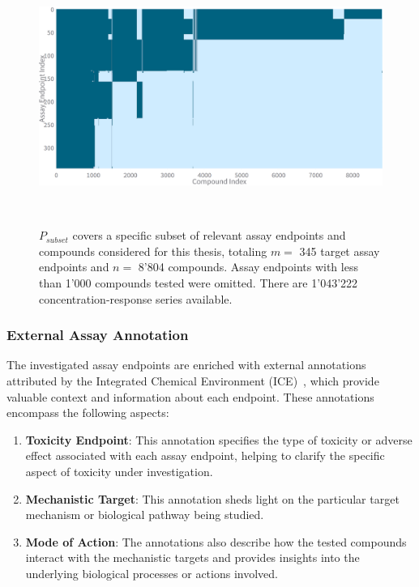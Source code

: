 \begin{figure}[h]
    \centering
    \includegraphics[width=1.0\textwidth]{figures/presence_matrix_subset.png}
    \caption{$P_{subset}$ covers a specific subset of relevant assay endpoints and compounds considered for this thesis, totaling $m =$ 345 target assay endpoints and $n =$ 8'804 compounds. Assay endpoints with less than 1'000 compounds tested were omitted. There are 1'043'222 concentration-response series available.}
~\label{fig:presence_matrix_subset}
\end{figure}


\subsubsection{External Assay Annotation}
The investigated assay endpoints are enriched with external annotations attributed by the Integrated Chemical Environment (ICE)~\cite{ice2022}, which provide valuable context and information about each endpoint. These annotations encompass the following aspects:

\begin{enumerate}
    \item \textbf{Toxicity Endpoint}: This annotation specifies the type of toxicity or adverse effect associated with each assay endpoint, helping to clarify the specific aspect of toxicity under investigation.
    
    \item \textbf{Mechanistic Target}: This annotation sheds light on the particular target mechanism or biological pathway being studied.
    
    \item \textbf{Mode of Action}: The annotations also describe how the tested compounds interact with the mechanistic targets and provides insights into the underlying biological processes or actions involved.
\end{enumerate}

